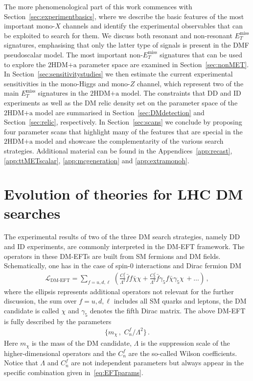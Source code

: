 \documentclass[a4paper, 11pt,notoc]{article}
\newcommand{\MET}{\ensuremath{E_T^\mathrm{miss}}\xspace}
\newcommand{\hdma}{\ensuremath{\textrm{2HDM+a}}\xspace}
\begin{document}
The more phenomenological part of this work commences with Section~\ref{sec:experimentbasics}, where we describe the basic features of the most important mono-$X$ channels and identify the experimental observables that can be exploited to search for them. We discuss both resonant and non-resonant $\MET$ signatures, emphasising that only the latter type of signals is present in the DMF pseudoscalar model. The most important non-$\MET$ signatures that can be used to explore the \hdma parameter space  are examined in Section~\ref{sec:nonMET}. In Section~\ref{sec:sensitivitystudies} we then estimate the current experimental sensitivities  in the mono-Higgs and mono-$Z$ channel, which represent two of the main $\MET$ signatures in the \hdma model. The constraints that DD and ID experiments as well as the DM relic density set on the parameter space of the \hdma model are summarised in Section~\ref{sec:DMdetection} and Section~\ref{sec:relic}, respectively. In Section~\ref{sec:scans} we conclude by proposing four parameter scans that highlight many of the features that are special in the \hdma model and showcase the complementarity of the various search strategies.  Additional material can be found in the Appendices~\ref{app:recast}, \ref{app:ttMETscalar}, \ref{app:mcgeneration} and \ref{app:extramonoh}.


\section{Evolution of theories for LHC DM searches} 
\label{sec:evolution}

The experimental results of two of the three DM search strategies, namely DD and ID experiments, are commonly interpreted in the DM-EFT framework. The operators in these DM-EFTs are built from SM fermions and DM fields. Schematically, one has in the case of spin-0 interactions and Dirac fermion DM
\begin{align}\label{eq:EFT}
\mathcal{L}_\text{DM-EFT}= \sum_{f=u, d, \ell} \,\left(\frac{C_{1}^f}{\Lambda^2} \bar f f \bar \chi \chi  +\frac{C_{2}^f}{\Lambda^2} \bar  f \gamma_5 f \bar \chi\gamma_5 \chi \,+\ldots \right) \,, 
\end{align}
 where the ellipsis represents additional operators not relevant for the further discussion, the sum over $f=u,d,\ell$ includes all SM quarks and leptons, the DM candidate is called $\chi$  and $\gamma_5$ denotes the fifth Dirac matrix. The above DM-EFT is fully described by the parameters
\begin{align}\label{eq:EFTparams}
\big\{ m_\chi\,,\,\, C_n^f/\Lambda^2 \big\} \,.
\end{align}
Here $m_\chi$ is the mass of the DM candidate, $\Lambda$ is the suppression scale of the higher-dimensional operators and the $C_n^f$ are the so-called Wilson coefficients. Notice that $\Lambda$ and $C_n^f$ are not independent parameters but always appear in the specific combination given in~\eqref{eq:EFTparams}. 
\end{document}
